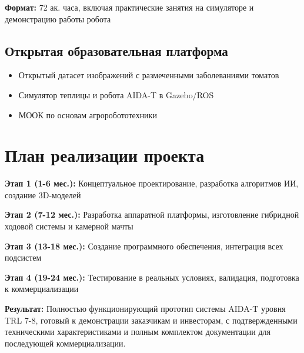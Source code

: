 \documentclass[12pt,a4paper]{article}
\begin{document}
\textbf{Формат:} 72 ак. часа, включая практические занятия на симуляторе и демонстрацию работы робота

\subsection{Открытая образовательная платформа}
\begin{itemize}
    \item Открытый датасет изображений с размеченными заболеваниями томатов
    \item Симулятор теплицы и робота AIDA-T в Gazebo/ROS
    \item МООК по основам агроробототехники
\end{itemize}

\section{План реализации проекта}

\textbf{Этап 1 (1-6 мес.):} Концептуальное проектирование, разработка алгоритмов ИИ, создание 3D-моделей

\textbf{Этап 2 (7-12 мес.):} Разработка аппаратной платформы, изготовление гибридной ходовой системы и камерной мачты

\textbf{Этап 3 (13-18 мес.):} Создание программного обеспечения, интеграция всех подсистем

\textbf{Этап 4 (19-24 мес.):} Тестирование в реальных условиях, валидация, подготовка к коммерциализации

\textbf{Результат:} Полностью функционирующий прототип системы AIDA-T уровня TRL 7-8, готовый к демонстрации заказчикам и инвесторам, с подтвержденными техническими характеристиками и полным комплектом документации для последующей коммерциализации.
\end{document}
